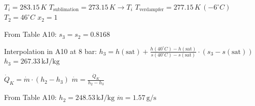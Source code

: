 \( T_i = 283.15 \, K \)  
\( T_{\text{sublimation}} = 273.15 \, K \rightarrow T_i \)  
\( T_{\text{verdampfer}} = 277.15 \, K \, (-6^\circ C) \)  
\( T_2 = 46^\circ C \)  
\( x_2 = 1 \)  

From Table A10:  
\( s_3 = s_2 = 0.8168 \)  

Interpolation in A10 at 8 bar:  
\( h_3 = h(\text{sat}) + \frac{h(40^\circ C) - h(\text{sat})}{s(40^\circ C) - s(\text{sat})} \cdot (s_3 - s(\text{sat})) \)  
\( h_3 = 267.33 \, \text{kJ/kg} \)  

\( \dot{Q}_K = \dot{m} \cdot (h_2 - h_3) \)  
\( \dot{m} = \frac{\dot{Q}_K}{h_2 - h_3} \)  

From Table A10:  
\( h_2 = 248.53 \, \text{kJ/kg} \)  
\( \dot{m} = 1.57 \, \text{g/s} \)